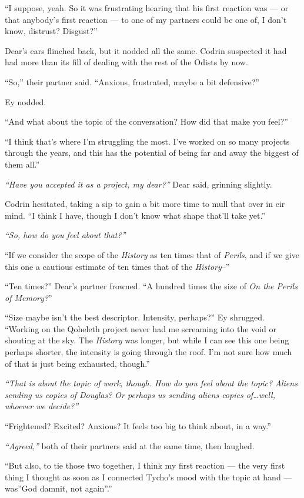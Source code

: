 ``I suppose, yeah. So it was frustrating hearing that his first reaction was — or that anybody's first reaction — to one of my partners could be one of, I don't know, distrust? Disgust?''

Dear's ears flinched back, but it nodded all the same. Codrin suspected it had had more than its fill of dealing with the rest of the Odists by now.

``So,'' their partner said. ``Anxious, frustrated, maybe a bit defensive?''

Ey nodded.

``And what about the topic of the conversation? How did that make you feel?''

``I think that's where I'm struggling the most. I've worked on so many projects through the years, and this has the potential of being far and away the biggest of them all.''

\emph{``Have you accepted it as a project, my dear?''} Dear said, grinning slightly.

Codrin hesitated, taking a sip to gain a bit more time to mull that over in eir mind. ``I think I have, though I don't know what shape that'll take yet.''

\emph{``So, how do you feel about that?''}

``If we consider the scope of the \emph{History} as ten times that of \emph{Perils}, and if we give this one a cautious estimate of ten times that of the \emph{History}--''

``Ten times?'' Dear's partner frowned. ``A hundred times the size of \emph{On the Perils of Memory?}''

``Size maybe isn't the best descriptor. Intensity, perhaps?'' Ey shrugged. ``Working on the Qoheleth project never had me screaming into the void or shouting at the sky. The \emph{History} was longer, but while I can see this one being perhaps shorter, the intensity is going through the roof. I'm not sure how much of that is just being exhausted, though.''

\emph{``That is about the topic of work, though. How do you feel about the topic? Aliens sending us copies of Douglas? Or perhaps us sending aliens copies of\ldots well, whoever we decide?''}

``Frightened? Excited? Anxious? It feels too big to think about, in a way.''

\emph{``Agreed,''} both of their partners said at the same time, then laughed.

``But also, to tie those two together, I think my first reaction — the very first thing I thought as soon as I connected Tycho's mood with the topic at hand — was''God damnit, not again''.''

